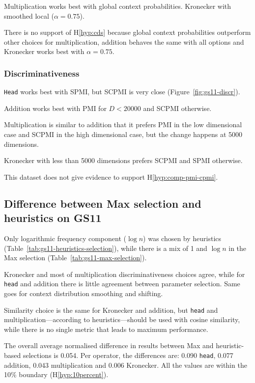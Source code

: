 Multiplication works best with global context probabilities. Kronecker with smoothed local ($\alpha = 0.75$).

There is no support of H\ref{hyp:cds} because global context probabilities outperform other choices for multiplication, addition behaves the same with all options and Kronecker works best with $\alpha = 0.75$.

\subsubsection{Discriminativeness}



\texttt{Head} works best with SPMI, but SCPMI is very close (Figure~\ref{fig:gs11-discr}).

Addition works best with PMI for $D < 20000$ and SCPMI otherwise.

Multiplication is similar to addition that it prefers PMI in the low dimensional case and SCPMI in the high dimensional case, but the change happens at 5000 dimensions.

Kronecker with less than 5000 dimensions prefers SCPMI and SPMI otherwise.

This dataset does not give evidence to support H\ref{hyp:comp-pmi-cpmi}.

\subsection{Difference between Max selection and heuristics on GS11}

Only logarithmic frequency component ($\log n$) was chosen by heuristics (Table~\ref{tab:gs11-heuristics-selection}), while there is a mix of 1 and $\log n$ in the Max selection (Table~\ref{tab:gs11-max-selection}).

Kronecker and most of multiplication discriminativeness choices agree, while for \texttt{head} and addition there is little agreement between parameter selection. Same goes for context distribution smoothing and shifting.

Similarity choice is the same for Kronecker and addition, but \texttt{head} and multiplication---according to heuristics---should be used with cosine similarity, while there is no single metric that leads to maximum performance.

The overall average normalised difference in results between Max and heuristic-based selections is 0.054. Per operator, the differences are: 0.090 \texttt{head}, 0.077 addition, 0.043 multiplication and 0.006 Kronecker. All the values are within the 10\% boundary (H\ref{hyp:10percent}).

